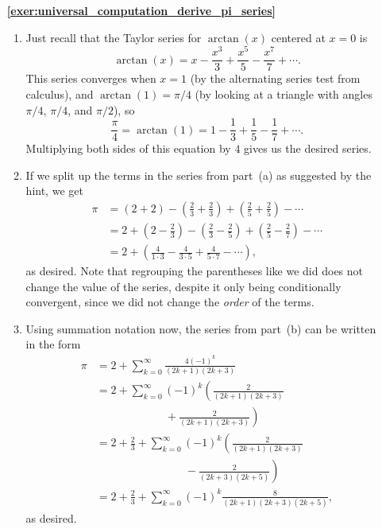 \begin{multicols}{2}
	\begin{itemize}[leftmargin=0em]
		\item[\bf\color{ocre}\sffamily\ref{exer:universal_computation_derive_pi_series}] \begin{enumerate}[leftmargin=1.5em,label=\bf\color{ocre}(\alph*)]
			\item Just recall that the Taylor series for $\arctan(x)$ centered at $x = 0$ is
			\[
				\arctan(x) = x - \frac{x^3}{3} + \frac{x^5}{5} - \frac{x^7}{7} + \cdots.
			\]
			This series converges when $x = 1$ (by the alternating series test from calculus), and $\arctan(1) = \pi/4$ (by looking at a triangle with angles $\pi/4$, $\pi/4$, and $\pi/2$), so
			\[
				\frac{\pi}{4} = \arctan(1) = 1 - \frac{1}{3} + \frac{1}{5} - \frac{1}{7} + \cdots.
			\]
			Multiplying both sides of this equation by $4$ gives us the desired series.
			
			\item If we split up the terms in the series from part~(a) as suggested by the hint, we get
			\begin{align*}
				\pi & = (2 + 2) - \left(\frac{2}{3} + \frac{2}{3}\right) + \left(\frac{2}{5} + \frac{2}{5}\right) - \cdots \\
				& = 2 + \left(2 - \frac{2}{3}\right) - \left(\frac{2}{3} - \frac{2}{5}\right) + \left(\frac{2}{5} - \frac{2}{7}\right) - \cdots \\
				& = 2 + \left(\frac{4}{1\cdot 3} - \frac{4}{3\cdot 5} + \frac{4}{5\cdot 7} - \cdots\right),
			\end{align*}
			as desired. Note that regrouping the parentheses like we did does not change the value of the series, despite it only being conditionally convergent, since we did not change the \emph{order} of the terms.
			
			\item Using summation notation now, the series from part~(b) can be written in the form
			\begin{align*}
				\pi & = 2 + \sum_{k=0}^\infty \frac{4(-1)^k}{(2k+1)(2k+3)} \\
				& = 2 + \sum_{k=0}^\infty (-1)^k\left(\frac{2}{(2k+1)(2k+3)}\right. \\
				& \qquad \qquad \qquad \ {} + \left.\frac{2}{(2k+1)(2k+3)}\right) \\
				& = 2 + \frac{2}{3} + \sum_{k=0}^\infty (-1)^k\left(\frac{2}{(2k+1)(2k+3)}\right. \\
				& \qquad \qquad \qquad \qquad {} - \left.\frac{2}{(2k+3)(2k+5)}\right) \\
				& = 2 + \frac{2}{3} + \sum_{k=0}^\infty (-1)^k\frac{8}{(2k+1)(2k+3)(2k+5)},
			\end{align*}
			as desired.
			

\end{enumerate}
\end{itemize}
\end{multicols}
